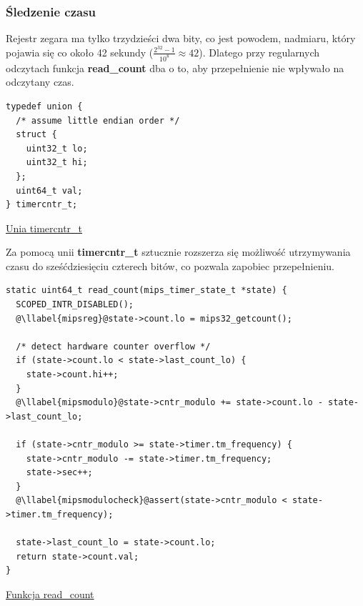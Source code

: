 \documentclass[shortabstract]{iithesis}
\makeatletter
\theoremstyle{definition} \newtheorem*{definition}{Definicja}
\theoremstyle{definition} \newtheorem*{example}{Przykład}
\theoremstyle{definition} \newtheorem*{remark}{Uwaga}
\newenvironment{longlisting}{\captionsetup{type=listing}}{}
\newcounter{llabel}[listing]%
\renewcommand*{\thellabel}{%
    \ifnum\value{llabel}<0 %
      \@ctrerr
    \else
      \ifnum\value{llabel}>10 %
        \@ctrerr
      \else
        \protect\ding{\the\numexpr\value{llabel}+201\relax}%
      \fi
    \fi
  }%
\newlength{\llabelsep}
\newcommand*{\llabel}[1]{%
  \begingroup
  \refstepcounter{llabel}%
  \label{#1}%
  \llap{\thellabel\kern\llabelsep}%
  \endgroup
}
\makeatother
\begin{document}
\subsubsection{Śledzenie czasu}
Rejestr zegara ma tylko trzydzieści dwa bity, co jest powodem, nadmiaru, który pojawia się co około 42 sekundy ($\frac{2^{32}-1}{10^8} \approx 42$). Dlatego przy regularnych odczytach funkcja \textbf{read\_count} dba o to, aby przepełnienie nie wpływało na odczytany czas.

\begin{longlisting}
  \begin{verbatim}
typedef union {
  /* assume little endian order */
  struct {
    uint32_t lo;
    uint32_t hi;
  };
  uint64_t val;
} timercntr_t;
  \end{verbatim}
  \caption{\href{https://mimiker.ii.uni.wroc.pl/source/xref/mimiker/include/sys/timer.h?r=4b37e316\#17}{Unia timercntr\_t}}
  \label{lst:uniontimercntr}
\end{longlisting}

Za pomocą unii \textbf{timercntr\_t} sztucznie rozszerza się możliwość utrzymywania czasu do sześćdziesięciu czterech bitów, co pozwala zapobiec przepełnieniu.

\begin{longlisting}
  \begin{verbatim}
static uint64_t read_count(mips_timer_state_t *state) {
  SCOPED_INTR_DISABLED();
  @\llabel{mipsreg}@state->count.lo = mips32_getcount();

  /* detect hardware counter overflow */
  if (state->count.lo < state->last_count_lo) {
    state->count.hi++;
  }
  @\llabel{mipsmodulo}@state->cntr_modulo += state->count.lo - state->last_count_lo;

  if (state->cntr_modulo >= state->timer.tm_frequency) {
    state->cntr_modulo -= state->timer.tm_frequency;
    state->sec++;
  }
  @\llabel{mipsmodulocheck}@assert(state->cntr_modulo < state->timer.tm_frequency);

  state->last_count_lo = state->count.lo;
  return state->count.val;
}
  \end{verbatim}
  \caption{\href{https://mimiker.ii.uni.wroc.pl/source/xref/mimiker/sys/mips/timer.c?r=db7eaf68\#28}{Funkcja read\_count}}
  \label{lst:funcreadcount}
\end{longlisting}
\end{document}
